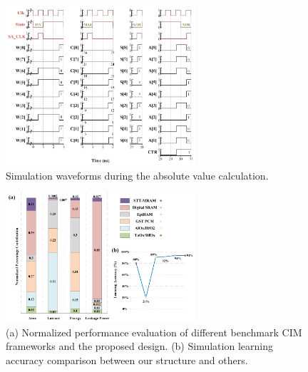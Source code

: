 \documentclass[submit]{elex2024}%
\begin{document}
\begin{figure}[htb]
    \begin{center}
    \includegraphics[width=7cm]{Figures/fig9.pdf}
    \end{center}
    \caption{Simulation waveforms during the absolute value calculation.}
    \label{fig:9}
\end{figure}
\begin{figure}[htb]
    \begin{center}
    \includegraphics[width=7cm]{Figures/fig10.pdf}
    \end{center}
    \caption{(a) Normalized performance evaluation of different benchmark CIM frameworks and the proposed design. (b) Simulation learning accuracy comparison between our structure and others.}
    \label{fig:10}
\end{figure}
\end{document}
